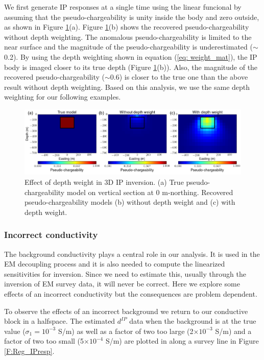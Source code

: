 \documentclass[a4paper, 11pt]{article}
\newcommand{\dip}{d^{IP}}
\begin{document}
We first generate IP responses at a single time using the linear funcional by assuming that the pseudo-chargeability is unity inside the body and zero outside, as shown in  Figure \ref{F:Depthweight}(a). 
Figure \ref{F:Depthweight}(b) shows the recovered pseudo-chargeability without depth weighting. 
The anomalous pseudo-chargeability is limited to the near surface and the magnitude of the pseudo-chargeability is underestimated ($\sim$0.2). 
By using the depth weighting shown in equation (\ref{eq: weight_mat}),  the IP body is imaged closer to its true depth (Figure \ref{F:Depthweight}(b)). 
Also, the magnitude of the recovered pseudo-chargeability ($\sim$0.6) is closer to the true one than the above result without depth weighting. 
Based on this analysis, we use the same depth weighting for our  following examples. 

\begin{figure}[htb]
  \centering
  \includegraphics[width=1.\textwidth]{figures/Depthweight.png}
  \caption{Effect of depth weight in 3D IP inversion. (a) True pseudo-chargeability model on vertical section at 0 m-northing. Recovered pseudo-chargeability models (b) without depth weight and (c) with depth weight.}
  \label{F:Depthweight}
\end{figure}
\clearpage

\subsubsection{Incorrect conductivity}
The background conductivity plays a central role in our analysis. It is used in the EM decoupling process and it is also needed to compute the linearized sensitivities for inversion. Since we need to estimate this, usually through the inversion of EM survey data, it will never be correct. Here we explore some effects of an incorrect conductivity but  the consequences are problem dependent.

To observe the effects of an incorrect background we return to our conductive block in a halfspace. The estimated $\dip$ data when the background is at the true value ($\sigma_1 = 10^{-3}$ S/m) as well as a factor of two too large (2$\times10^{-3}$ S/m) and a factor of two too small (5$\times10^{-4}$ S/m) are plotted in along a survey line in Figure \ref{F:Reg_IPresp}.
\end{document}
